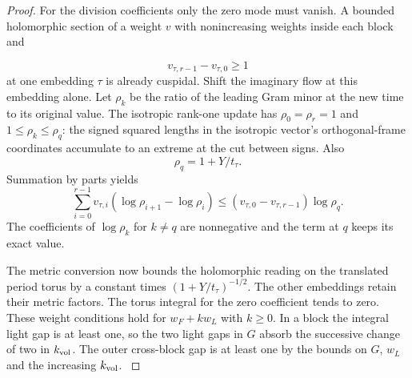 \begin{proof}
For the division coefficients only the zero mode must
vanish. A bounded holomorphic section of a weight \(v\)
with nonincreasing weights inside each block and

\[
  v_{\tau,r-1}-v_{\tau,0}\ge1
\]
 at one embedding \(\tau\)
is already cuspidal. Shift the imaginary flow at this
embedding alone. Let \(\rho_k\) be the ratio of the
leading Gram minor at the new time to its original
value. The isotropic rank-one update has
\(\rho_0=\rho_r=1\) and \(1\le \rho_k\le\rho_q\):
the signed squared lengths in the isotropic vector's
orthogonal-frame coordinates accumulate to an extreme
at the cut between signs. Also 
\[
  \rho_q=1+Y/t_\tau.
\]
Summation by parts yields
\[
 \sum_{i=0}^{r-1} v_{\tau,i}
       (\log\rho_{i+1}-\log\rho_i)
     \le (v_{\tau,0}-v_{\tau,r-1})\log\rho_q .
\]
The coefficients of \(\log\rho_k\) for \(k\ne q\) are
nonnegative and the term at \(q\) keeps its exact value.

The metric conversion now bounds the holomorphic
reading on the translated period torus by a constant
times \((1+Y/t_\tau)^{-1/2}\).
The other embeddings retain their metric factors.
The torus integral for the zero coefficient tends
to zero. These weight conditions hold for \(w_F+k w_L\)
with \(k\ge0\). In a block the integral light gap is
at least one, so the two light gaps in \(G\) absorb
the successive change of two in \(k_{\rm vol}\). The
outer cross-block gap is at least one by the bounds
on \(G\), \(w_L\) and the increasing \(k_{\rm vol}\).
\label{cor:slice-short-analytic-7}
\end{proof}
